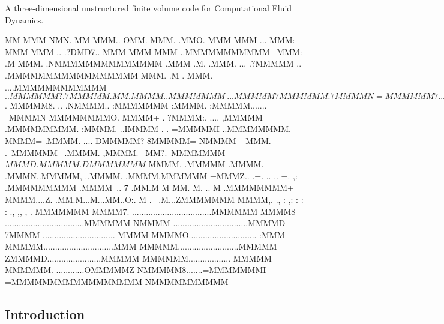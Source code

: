 A three-\/dimensional unstructured finite volume code for Computational Fluid Dynamics. \begin{DoxyVerb}         MM          MMM
        NMN.           MM
       MMM..   OMM.    MMM.
      .MMO.    MMM      MMM                         ...
      MMM:     MMM      MMM                       .. .?DMD7..
      MMM      MMM      MMM                      ..MMMMMMMMMMM~
      MMM:     .M       MMM.                    .NMMMMMMMMMMMMMM
      .MMM     .M.     .MMM.    ... .?MMMMM .. .MMMMMMMMMMMMMMMMM
       MMM.    .M .    MMM. ....MMMMMMMMMMMM$..MMMMMM?     .7MMMMM.
          MM.  M  M   MM  ..MMMMMMM~.. .MMMMM7MMMMMM.        7MMMMN
                        =MMMMMM7..  ..MMM.MMMMMMMMM+         .MMMMM.
                     DMMMMMD..  . . MMMM. .MMMMMMMM.        ..MMMMM.
                ..=MMMMMZ.     ...MMMM      MMMMMMMI.        .MMMM$.
                MMMMM8.   ..  .NMMMM..      :MMMMMMM         :MMMM.
             :MMMMM.......  ~MMMMN           MMMMMMMMO.      MMMM+
         . ?MMMM:. ....  ,MMMMM              .MMMMMMMMM.    :MMMM.
       ..IMMMM  .  .  =MMMMMI                ..MMMMMMMM.    MMMM=
       .MMMM. .... DMMMMM?                     8MMMMM=     NMMMM
      +MMM.   .~MMMMMM~                        .MMMM.     ,MMMM.
     ~MM?.~MMMMMMM$                              MMMD    .MMMMM
    .DMMMMMMM$                                   MMMM.  .MMMMM
     .MMMM.                                      .MMMN..MMMMM,
     ..MMMM.                                     .MMMM.MMMMMM
       =MMMZ..   .=. ..         ..      =. ,:     .MMMMMMMMM
       .MMMM~..  7  .MM.M   M   MM.    M.  ..  M  .MMMMMMMM+
         MMMM....Z. .MM.M...M...MM..O:.  M . ~.M...ZMMMMMMM
          MMMM,. ., :  ,:   :  :  :    .,  ,,  ,  . MMMMMMM
           MMMM7. ..................................MMMMMM
            MMMM8 ..................................MMMMMM
             NMMMM  ................................MMMMD
              7MMMM ............................... MMMM
                MMMMO............................. :MMM
                 MMMMM..............................MMM
                   MMMMM..........................MMMMM
                    ZMMMMD.......................MMMMM
                      MMMMMM.................. MMMMM
                        MMMMMM. ............OMMMMMZ
                          NMMMMM8.......=MMMMMMMI
                            =MMMMMMMMMMMMMMMMM
                               NMMMMMMMMMM
\end{DoxyVerb}


\subsection*{Introduction }

